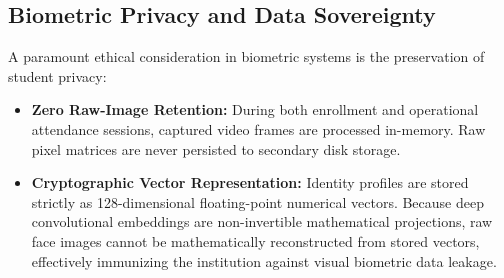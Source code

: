 \subsection{Biometric Privacy and Data Sovereignty}
A paramount ethical consideration in biometric systems is the preservation of student privacy:
\begin{itemize}
    \item \textbf{Zero Raw-Image Retention:} During both enrollment and operational attendance sessions, captured video frames are processed in-memory. Raw pixel matrices are never persisted to secondary disk storage.
    \item \textbf{Cryptographic Vector Representation:} Identity profiles are stored strictly as 128-dimensional floating-point numerical vectors. Because deep convolutional embeddings are non-invertible mathematical projections, raw face images cannot be mathematically reconstructed from stored vectors, effectively immunizing the institution against visual biometric data leakage.
\end{itemize}
